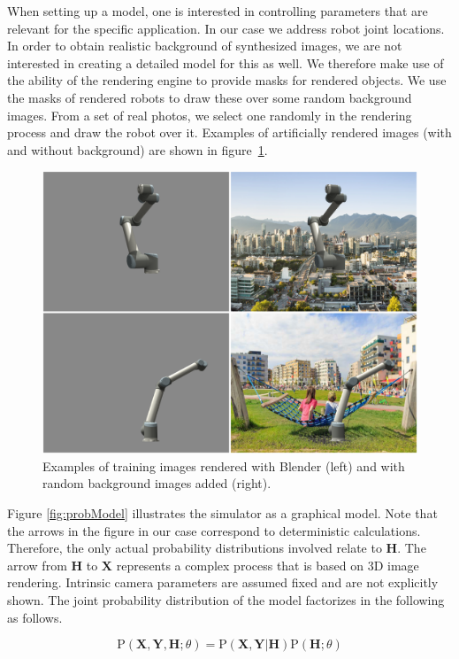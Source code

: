\documentclass[conference]{IEEEtran}
\begin{document}
    When setting up a model, one is interested in controlling parameters that are relevant for the specific application. In our case we address robot joint locations. In order to obtain realistic background of synthesized images, we are not interested in creating a detailed model for this as well. We therefore make use of the ability of the rendering engine to provide masks for rendered objects. We use the masks of rendered robots to draw these over some random background images. From a set of real photos, we select one randomly in the rendering process and draw the robot over it. Examples of artificially rendered images (with and without background) are shown in figure~\ref{fig:ur10examples}.
    
    \begin{figure}[htbp]
        \centerline{\includegraphics[width=0.9\columnwidth]{figures/examplesUR10/renderedImages.png}}
        \caption{\label{fig:ur10examples} Examples of training images rendered with Blender (left) and with random background images added (right).}
    \end{figure}
    
    Figure \ref{fig:probModel} illustrates the simulator as a graphical model. Note that the arrows in the figure in our case correspond to deterministic calculations. Therefore, the only actual probability distributions involved relate to $\mathbf{H}$. The arrow from $\mathbf{H}$ to $\mathbf{X}$ represents a complex process that is based on 3D image rendering. Intrinsic camera parameters are assumed fixed and are not explicitly shown. The joint probability distribution of the model factorizes in the following as follows.
    
    \begin{equation}
    \mathrm{P}(\mathbf{X}, \mathbf{Y}, \mathbf{H}; \theta) = \mathrm{P}(\mathbf{X}, \mathbf{Y} | \mathbf{H}) \mathrm{P}(\mathbf{H}; \theta)
    \end{equation}
\end{document}
